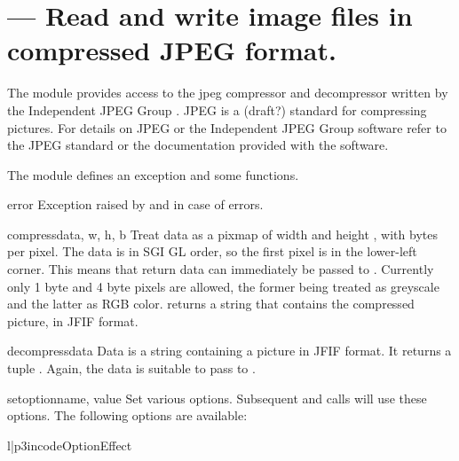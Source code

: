 \section{ ---
         Read and write image files in compressed JPEG format.}



The module  provides access to the jpeg compressor and
decompressor written by the Independent JPEG Group%
%
. JPEG is a (draft?)
standard for compressing pictures.  For details on JPEG or the
Independent JPEG Group software refer to the JPEG standard or the
documentation provided with the software.

The  module defines an exception and some functions.

\begin{excdesc}{error}
Exception raised by  and 
in case of errors.
\end{excdesc}

\begin{funcdesc}{compress}{data, w, h, b}
Treat data as a pixmap of width  and height , with
 bytes per pixel.  The data is in SGI GL order, so the first
pixel is in the lower-left corner. This means that 
return data can immediately be passed to .
Currently only 1 byte and 4 byte pixels are allowed, the former being
treated as greyscale and the latter as RGB color.
 returns a string that contains the compressed
picture, in JFIF format.
\end{funcdesc}

\begin{funcdesc}{decompress}{data}
Data is a string containing a picture in JFIF format. It
returns a tuple .  Again, the data is suitable to pass to
.
\end{funcdesc}

\begin{funcdesc}{setoption}{name, value}
Set various options.  Subsequent  and
 calls will use these options.  The following
options are available:

\begin{tableii}{l|p{3in}}{code}{Option}{Effect}
\end{tableii}
\end{funcdesc}
